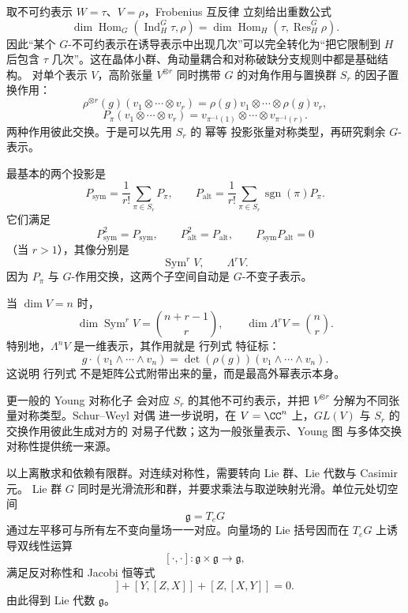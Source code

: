 取不可约表示 $W=\tau$、$V=\rho$，Frobenius 互反律 立刻给出重数公式
\[
\dim\operatorname{Hom}_G(\operatorname{Ind}_H^G\tau,\rho)
=
\dim\operatorname{Hom}_H(\tau,\operatorname{Res}_H^G\rho).
\]
因此“某个 $G$-不可约表示在诱导表示中出现几次”可以完全转化为“把它限制到 $H$ 后包含 $\tau$ 几次”。这在晶体小群、角动量耦合和对称破缺分支规则中都是基础结构。
对单个表示 $V$，高阶张量 $V^{\otimes r}$ 同时携带 $G$ 的对角作用与置换群 $S_r$ 的因子置换作用：
\[
\rho^{\otimes r}(g)
(v_1\otimes\cdots\otimes v_r)
=
\rho(g)v_1\otimes\cdots\otimes\rho(g)v_r,
\]
\[
P_\pi(v_1\otimes\cdots\otimes v_r)
=
v_{\pi^{-1}(1)}\otimes\cdots\otimes v_{\pi^{-1}(r)}.
\]
两种作用彼此交换。于是可以先用 $S_r$ 的 幂等 投影张量对称类型，再研究剩余 $G$-表示。

最基本的两个投影是
\begin{equation*}P_{\mathrm{sym}}
=
\frac1{r!}\sum_{\pi\in S_r}P_\pi,
\qquad
P_{\mathrm{alt}}
=
\frac1{r!}\sum_{\pi\in S_r}
\operatorname{sgn}(\pi)P_\pi.\end{equation*}
它们满足
\[
P_{\mathrm{sym}}^2=P_{\mathrm{sym}},
\qquad
P_{\mathrm{alt}}^2=P_{\mathrm{alt}},
\qquad
P_{\mathrm{sym}}P_{\mathrm{alt}}=0
\]
（当 $r>1$），其像分别是
\[
\operatorname{Sym}^rV,
\qquad
\Lambda^rV.
\]
因为 $P_\pi$ 与 $G$-作用交换，这两个子空间自动是 $G$-不变子表示。

当 $\dim V=n$ 时，
\[
\dim\operatorname{Sym}^rV
=\binom{n+r-1}{r},
\qquad
\dim\Lambda^rV
=\binom nr.
\]
特别地，$\Lambda^nV$ 是一维表示，其作用就是 行列式 特征标：
\[
g\cdot(v_1\wedge\cdots\wedge v_n)
=
\det(\rho(g))
(v_1\wedge\cdots\wedge v_n).
\]
这说明 行列式 不是矩阵公式附带出来的量，而是最高外幂表示本身。

更一般的 Young 对称化子 会对应 $S_r$ 的其他不可约表示，并把 $V^{\otimes r}$ 分解为不同张量对称类型。Schur--Weyl 对偶 进一步说明，在 $V=\CC^n$ 上，$GL(V)$ 与 $S_r$ 的交换作用彼此生成对方的 对易子代数；这为一般张量表示、Young 图 与多体交换对称性提供统一来源。

以上离散求和依赖有限群。对连续对称性，需要转向 Lie 群、Lie 代数与 Casimir 元。
\label{sec:lie-groups-algebras}
Lie 群 $G$ 同时是光滑流形和群，并要求乘法与取逆映射光滑。单位元处切空间
\[
\mathfrak g=T_eG
\]
通过左平移可与所有左不变向量场一一对应。向量场的 Lie 括号因而在 $T_eG$ 上诱导双线性运算
\[
[\cdot,\cdot]:\mathfrak g\times\mathfrak g\to\mathfrak g,
\]
满足反对称性和 Jacobi 恒等式
\begin{equation*}[X,[Y,Z]]+[Y,[Z,X]]+[Z,[X,Y]]=0.\end{equation*}
由此得到 Lie 代数 $\mathfrak g$。

